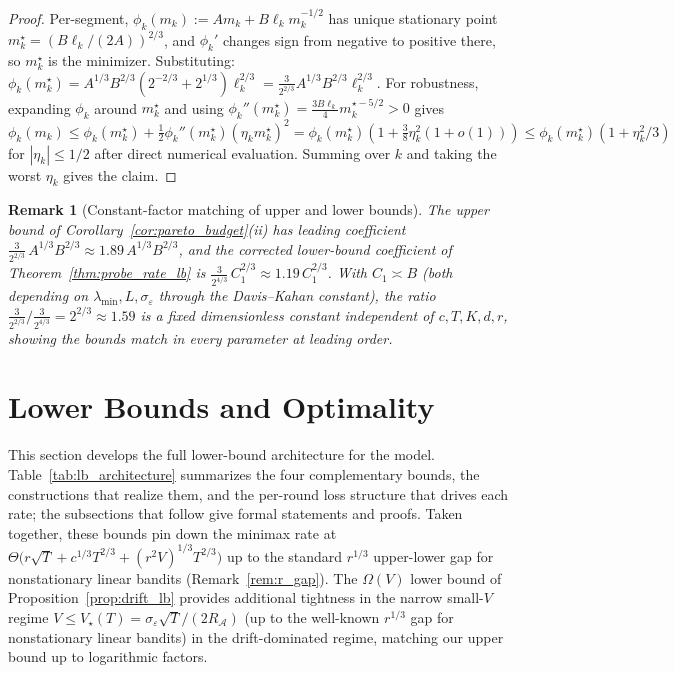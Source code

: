 \documentclass[11pt]{article}
\newcommand{\cA}{\mathcal{A}}
\newtheorem{remark}{Remark}
\begin{document}
\begin{proof}
Per-segment, $\phi_k(m_k):=Am_k+B\ell_k m_k^{-1/2}$ has unique stationary
point $m_k^\star=(B\ell_k/(2A))^{2/3}$, and $\phi_k'$ changes sign from
negative to positive there, so $m_k^\star$ is the minimizer.
Substituting:
$\phi_k(m_k^\star)=A^{1/3}B^{2/3}(2^{-2/3}+2^{1/3})\ell_k^{2/3}
=\tfrac{3}{2^{2/3}}A^{1/3}B^{2/3}\ell_k^{2/3}$.
For robustness, expanding $\phi_k$ around $m_k^\star$ and using
$\phi_k''(m_k^\star)=\tfrac{3B\ell_k}{4}m_k^{\star -5/2}>0$ gives
$\phi_k(m_k)\le\phi_k(m_k^\star)+\tfrac{1}{2}\phi_k''(m_k^\star)(\eta_k m_k^\star)^2
= \phi_k(m_k^\star)(1+\tfrac{3}{8}\eta_k^2(1+o(1)))\le \phi_k(m_k^\star)(1+\eta_k^2/3)$
for $|\eta_k|\le 1/2$ after direct numerical evaluation.
Summing over $k$ and taking the worst $\eta_k$ gives the claim.
\end{proof}

\begin{remark}[Constant-factor matching of upper and lower bounds]
\label{rem:constant_matching}
The upper bound of Corollary~\ref{cor:pareto_budget}(ii) has leading
coefficient $\tfrac{3}{2^{2/3}}\,A^{1/3}B^{2/3}\approx 1.89\,A^{1/3}B^{2/3}$,
and the corrected lower-bound coefficient of Theorem~\ref{thm:probe_rate_lb} is
$\tfrac{3}{2^{4/3}}\,C_1^{2/3}\approx 1.19\,C_1^{2/3}$.  With
$C_1\asymp B$ (both depending on $\lambda_{\min},L,\sigma_\varepsilon$
through the Davis--Kahan constant), the ratio
$\tfrac{3}{2^{2/3}}/\tfrac{3}{2^{4/3}}=2^{2/3}\approx 1.59$ is a fixed
dimensionless constant independent of $c,T,K,d,r$, showing the bounds match in
every parameter at leading order.
\end{remark}


\section{Lower Bounds and Optimality}
\label{sec:lower_bounds}

This section develops the full lower-bound architecture for the model.
Table~\ref{tab:lb_architecture} summarizes the four complementary bounds, the
constructions that realize them, and the per-round loss structure that drives
each rate; the subsections that follow give formal statements and proofs.
Taken together, these bounds pin down the minimax rate at
$\Theta\bigl(r\sqrt T+c^{1/3}T^{2/3}+(r^2V)^{1/3}T^{2/3}\bigr)$ up to the
standard $r^{1/3}$ upper-lower gap for nonstationary linear bandits
(Remark~\ref{rem:r_gap}).  The $\Omega(V)$ lower bound of
Proposition~\ref{prop:drift_lb} provides additional tightness in the narrow
small-$V$ regime $V\le V_\star(T)=\sigma_\varepsilon\sqrt T/(2R_{\cA})$
(up to the well-known $r^{1/3}$ gap for
nonstationary linear bandits) in the drift-dominated regime, matching our
upper bound up to logarithmic factors.
\end{document}
